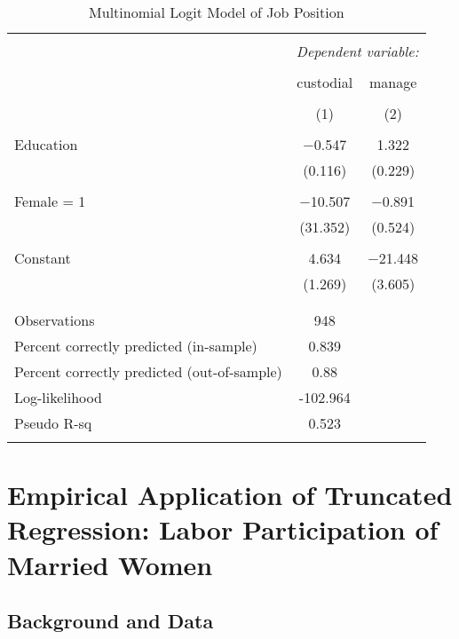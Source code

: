 \documentclass[
  12pt,
]{article}
\begin{document}
\begin{table}[t] \centering 
  \caption{Multinomial Logit Model of Job Position} 
  \label{job} 
\begin{tabular}{@{\extracolsep{5pt}}lcc} 
\\[-1.8ex]\hline 
\hline \\[-1.8ex] 
 & \multicolumn{2}{c}{\textit{Dependent variable:}} \\ 
\cline{2-3} 
\\[-1.8ex] & custodial & manage \\ 
\\[-1.8ex] & (1) & (2)\\ 
\hline \\[-1.8ex] 
 Education & $-$0.547 & 1.322 \\ 
  & (0.116) & (0.229) \\ 
  & & \\ 
 Female = 1 & $-$10.507 & $-$0.891 \\ 
  & (31.352) & (0.524) \\ 
  & & \\ 
 Constant & 4.634 & $-$21.448 \\ 
  & (1.269) & (3.605) \\ 
  & & \\ 
\hline \\[-1.8ex] 
Observations & 948 &  \\ 
Percent correctly predicted (in-sample) & 0.839 &  \\ 
Percent correctly predicted (out-of-sample) & 0.88 &  \\ 
Log-likelihood & -102.964 &  \\ 
Pseudo R-sq & 0.523 &  \\ 
\hline 
\hline \\[-1.8ex] 
\end{tabular} 
\end{table}

\hypertarget{empirical-application-of-truncated-regression-labor-participation-of-married-women}{%
\section{Empirical Application of Truncated Regression: Labor
Participation of Married
Women}\label{empirical-application-of-truncated-regression-labor-participation-of-married-women}}

\hypertarget{background-and-data-2}{%
\subsection{Background and Data}\label{background-and-data-2}}
\end{document}
